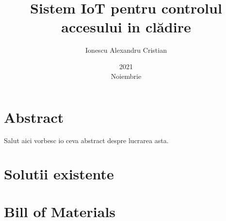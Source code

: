 \documentclass[12pt,english]{report}
\title{Sistem IoT pentru controlul accesului in clădire}
\date{2021\\ Noiembrie}
\author{Ionescu Alexandru Cristian}
\begin{document}
\maketitle

\chapter*{Abstract}
Salut aici vorbesc io ceva abstract despre lucrarea asta.

\tableofcontents

\chapter{Solutii existente}



\chapter{Bill of Materials}



\printbibliography
\end{document}
